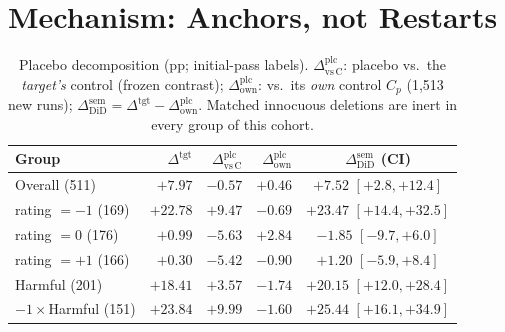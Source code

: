\documentclass[11pt]{article}
\newcommand{\ci}[2]{[#1, #2]}
\begin{document}
\section{Mechanism: Anchors, not Restarts}
\label{sec:mechanism}

\begin{table}[t]
\centering
\scriptsize
\setlength{\tabcolsep}{1.8pt}
\begin{tabular}{@{}lrrrc@{}}
\toprule
Group & $\Delta^{\mathrm{tgt}}$ & $\Delta^{\mathrm{plc}}_{\mathrm{vs\,C}}$ & $\Delta^{\mathrm{plc}}_{\mathrm{own}}$ & $\Delta^{\mathrm{sem}}_{\mathrm{DiD}}$ (CI) \\
\midrule
Overall (511)        & $+7.97$  & $-0.57$ & $+0.46$ & $+7.52$ $\ci{+2.8}{+12.4}$ \\
rating $=-1$ (169)   & $+22.78$ & $+9.47$ & $-0.69$ & $+23.47$ $\ci{+14.4}{+32.5}$ \\
rating $=0$ (176)    & $+0.99$  & $-5.63$ & $+2.84$ & $-1.85$ $\ci{-9.7}{+6.0}$ \\
rating $=+1$ (166)   & $+0.30$  & $-5.42$ & $-0.90$ & $+1.20$ $\ci{-5.9}{+8.4}$ \\
Harmful (201)        & $+18.41$ & $+3.57$ & $-1.74$ & $+20.15$ $\ci{+12.0}{+28.4}$ \\
$-1\times$Harmful (151) & $+23.84$ & $+9.99$ & $-1.60$ & $+25.44$ $\ci{+16.1}{+34.9}$ \\
\bottomrule
\end{tabular}
\caption{Placebo decomposition (pp; initial-pass labels). $\Delta^{\mathrm{plc}}_{\mathrm{vs\,C}}$: placebo vs.\ the \emph{target's} control (frozen contrast); $\Delta^{\mathrm{plc}}_{\mathrm{own}}$: vs.\ its \emph{own} control $C_p$ (1{,}513 new runs); $\Delta^{\mathrm{sem}}_{\mathrm{DiD}} = \Delta^{\mathrm{tgt}} - \Delta^{\mathrm{plc}}_{\mathrm{own}}$. Matched innocuous deletions are inert in every group of this cohort.}
\label{tab:placebo}
\end{table}
\end{document}
